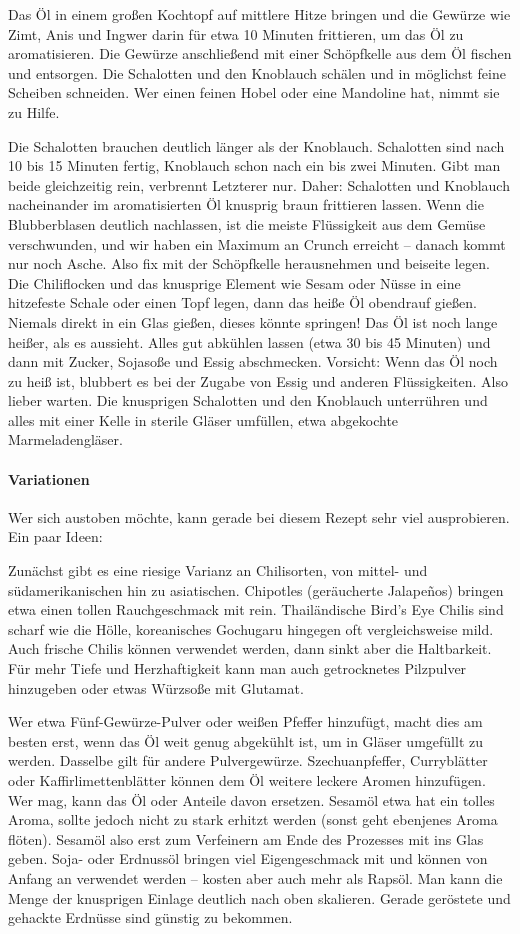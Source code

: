 Das Öl in einem großen Kochtopf auf mittlere Hitze bringen und die Gewürze 
wie Zimt,  Anis und Ingwer darin für etwa 10 Minuten frittieren, um das Öl zu 
aromatisieren. Die Gewürze anschließend mit einer Schöpfkelle aus dem Öl 
fischen und entsorgen.
Die Schalotten und den Knoblauch schälen und in möglichst feine Scheiben 
schneiden. Wer einen feinen Hobel oder eine Mandoline hat, nimmt sie zu Hilfe. 

Die Schalotten brauchen deutlich länger als der Knoblauch. Schalotten sind 
nach 10 bis 15 Minuten fertig, Knoblauch schon nach ein bis zwei Minuten. Gibt 
man beide gleichzeitig rein, verbrennt Letzterer nur. Daher: Schalotten und 
Knoblauch nacheinander im aromatisierten Öl knusprig braun frittieren lassen. 
Wenn die Blubberblasen deutlich nachlassen, ist die meiste Flüssigkeit aus 
dem Gemüse verschwunden, und wir haben ein Maximum an Crunch erreicht – 
danach kommt nur noch Asche. Also fix mit der Schöpfkelle herausnehmen und 
beiseite legen.
Die Chiliflocken und das knusprige Element wie Sesam oder Nüsse in eine 
hitzefeste Schale oder einen Topf legen, dann das heiße Öl obendrauf gießen. 
Niemals direkt in ein Glas gießen, dieses könnte springen! Das Öl ist noch lange 
heißer, als es aussieht.
Alles gut abkühlen lassen (etwa 30 bis 45 Minuten) und dann mit Zucker, 
Sojasoße und Essig abschmecken. Vorsicht: Wenn das Öl noch zu heiß ist, 
blubbert es bei der Zugabe von Essig und anderen Flüssigkeiten. Also lieber 
warten.
Die knusprigen Schalotten und den Knoblauch unterrühren und alles mit einer 
Kelle in sterile Gläser umfüllen, etwa abgekochte Marmeladengläser.
\paragraph{Variationen} Wer sich austoben möchte, kann gerade bei diesem 
Rezept sehr viel ausprobieren. Ein paar Ideen:

Zunächst gibt es eine riesige Varianz an Chilisorten, von mittel- und 
südamerikanischen hin zu asiatischen. Chipotles (geräucherte Jalapeños) 
bringen etwa einen tollen Rauchgeschmack mit rein. Thailändische Bird’s Eye 
Chilis sind scharf wie die Hölle, koreanisches Gochugaru hingegen oft 
vergleichsweise mild. Auch frische Chilis können verwendet werden, dann sinkt 
aber die Haltbarkeit.
Für mehr Tiefe und Herzhaftigkeit kann man auch getrocknetes Pilzpulver 
hinzugeben oder etwas Würzsoße mit Glutamat.

Wer etwa Fünf-Gewürze-Pulver oder weißen Pfeffer hinzufügt, macht dies am 
besten erst, wenn das Öl weit genug abgekühlt ist, um in Gläser umgefüllt zu 
werden. Dasselbe gilt für andere Pulvergewürze.
Szechuanpfeffer, Curryblätter oder Kaffirlimettenblätter können dem Öl weitere 
leckere Aromen hinzufügen.
Wer mag, kann das Öl oder Anteile davon ersetzen. Sesamöl etwa hat ein tolles 
Aroma, sollte jedoch nicht zu stark erhitzt werden (sonst geht ebenjenes 
Aroma flöten). Sesamöl also erst zum Verfeinern am Ende des Prozesses mit 
ins Glas geben. Soja- oder Erdnussöl bringen viel Eigengeschmack mit und 
können von Anfang an verwendet werden – kosten aber auch mehr als Rapsöl.
Man kann die Menge der knusprigen Einlage deutlich nach oben skalieren. 
Gerade geröstete und gehackte Erdnüsse sind günstig zu bekommen.

